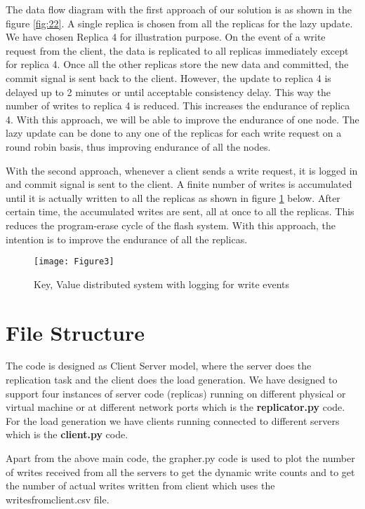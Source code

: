 The data flow diagram with the first approach of our solution is as shown in the figure  \ref{fig:22}. 
A single replica is chosen from all the replicas for the lazy update. We have chosen Replica 4 for illustration purpose. On the event of a write request from the client, the data is replicated to all replicas immediately except for replica 4. Once all the other replicas store the new data and committed, the commit signal is sent back to the client. However, the update to replica 4 is delayed up to 2 minutes or until acceptable consistency delay. This way the number of writes to replica 4 is reduced. This increases the endurance of replica 4. With this approach, we will be able to improve the endurance of one node. The lazy update can be done to any one of the replicas for each write request on a round robin basis, thus improving endurance of all the nodes.


With the second approach, whenever a client sends a write request, it is logged in and commit signal is sent to the client. A finite number of writes is accumulated until it is actually written to all the replicas as shown in figure \ref{fig:23} below. After certain time, the accumulated writes are sent, all at once to all the replicas. This reduces the program-erase cycle of the flash system. With this approach, the intention is to improve the endurance of all the replicas.

\begin{figure}[h]
    \centering
    \texttt{[image: Figure3]}
    \caption{Key, Value distributed system with logging for write events}
    \label{fig:23}
\end{figure}

\newpage

\section{File Structure}

The code is designed as Client Server model, where the server does the replication task and the client does the load generation. We have designed to support four instances of server code (replicas) running on different physical or virtual machine or at different network ports which is the \textbf{replicator.py} code. For the load generation we have clients running connected to different servers which is the \textbf{client.py} code. 

Apart from the above main code, the grapher.py code is used to plot the number of writes received from all the servers to get the dynamic write counts and to get the number of actual writes written from client which uses the writesfromclient.csv file.

